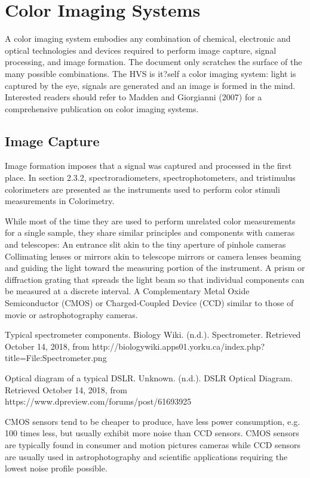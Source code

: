 \section{Color Imaging Systems}%
\label{sec:color-imaging-systems}

A color imaging system embodies any combination of chemical, electronic and optical technologies and devices required to perform image capture, signal processing, and image formation. The document only scratches the surface of the many possible combinations. The HVS is it?self a color imaging system: light is captured by the eye, signals are generated and an image is formed in the mind. Interested readers should refer to Madden and Giorgianni (2007) for a comprehensive publication on color imaging systems.

\subsection{Image Capture}%
\label{subsec:image-capture}

Image formation imposes that a signal was captured and processed in the first place.
In section 2.3.2, spectroradiometers, spectrophotometers, and tristimulus colorimeters are presented as the instruments used to perform color stimuli measurements in Colorimetry.

While most of the time they are used to perform unrelated color measurements for a single sample, they share similar principles and components with cameras and telescopes:
An entrance slit akin to the tiny aperture of pinhole cameras
Collimating lenses or mirrors akin to telescope mirrors or camera lenses beaming and guiding the light toward the measuring portion of the instrument.
A prism or diffraction grating that spreads the light beam so that individual components can be measured at a discrete interval.
A Complementary Metal Oxide Semiconductor (CMOS) or Charged-Coupled Device (CCD) similar to those of movie or astrophotography cameras.

Typical spectrometer components.
Biology Wiki. (n.d.). Spectrometer. Retrieved October 14, 2018, from http://biologywiki.apps01.yorku.ca/index.php?title=File:Spectrometer.png



Optical diagram of a typical DSLR.
Unknown. (n.d.). DSLR Optical Diagram. Retrieved October 14, 2018, from https://www.dpreview.com/forums/post/61693925

CMOS sensors tend to be cheaper to produce, have less power consumption, e.g. 100 times less, but usually exhibit more noise than CCD sensors. CMOS sensors are typically found in consumer and motion pictures cameras while CCD sensors are usually used in astrophotography and scientific applications requiring the lowest noise profile possible.

